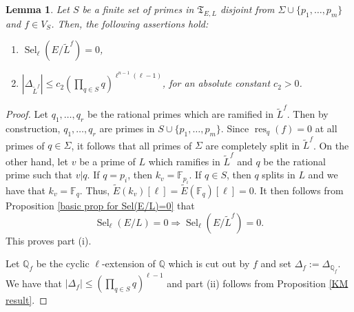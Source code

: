 \documentclass[11pt,reqno]{amsart}
\newtheorem{lemma}[theorem]{Lemma}
\newcommand{\Q}{\mathbb{Q}}
\newcommand{\F}{\mathbb{F}}
\newcommand{\op}[1]{\operatorname{#1}}
\numberwithin{equation}{section}
\begin{document}
\begin{lemma}\label{L twist f lemma}
    Let $S$ be a finite set of primes in $\mathfrak{T}_{E,L}$ disjoint from $\Sigma \cup \{p_1, \dots, p_m\}$ and $f\in V_S$. Then, the following assertions hold:
    \begin{enumerate}
\item[(i)]$\op{Sel}_\ell(E/\widetilde{L}^f)=0$,
        \item[(ii)] $ |\Delta_{\widetilde{L}^f}|\leq c_2\left(\prod_{q\in S} q\right)^{\ell^{n-1}(\ell-1)}$, for an absolute constant $c_2>0$.
    \end{enumerate}
     
\end{lemma}

\begin{proof}
    Let $q_1, \dots, q_r$ be the rational primes which are ramified in $\widetilde{L}^f$. Then by construction, $q_1, \dots, q_r$ are primes in $S\cup \{p_1, \dots,p_m\}$. Since $\op{res}_{q}(f)=0$ at all primes of $q\in \Sigma$, it follows that all primes of $\Sigma$ are completely split in $\widetilde{L}^f$.  On the other hand, let $v$ be a prime of $L$ which ramifies in $\widetilde{L}^f$ and $q$ be the rational prime such that $v|q$. If $q=p_i$, then $k_v=\F_{p_i}$. If $q\in S$, then $q$ splits in $L$ and we have that $k_v=\F_q$. Thus, $\widetilde{E}(k_v)[\ell]=\widetilde{E}(\F_q)[\ell]=0$. It then follows from Proposition \ref{basic prop for Sel(E/L)=0} that 
    \[\op{Sel}_\ell(E/L)=0\Rightarrow  \op{Sel}_\ell(E/\widetilde{L}^f)=0.\] This proves part (i).

    \par Let $\Q_f$ be the cyclic $\ell$-extension of $\Q$ which is cut out by $f$ and set $\Delta_f:=\Delta_{\Q_f}$. We have that $|\Delta_f|\leq (\prod_{q\in S} q)^{\ell-1}$ and part (ii) follows from Proposition \ref{KM result}.
\end{proof}
\end{document}
